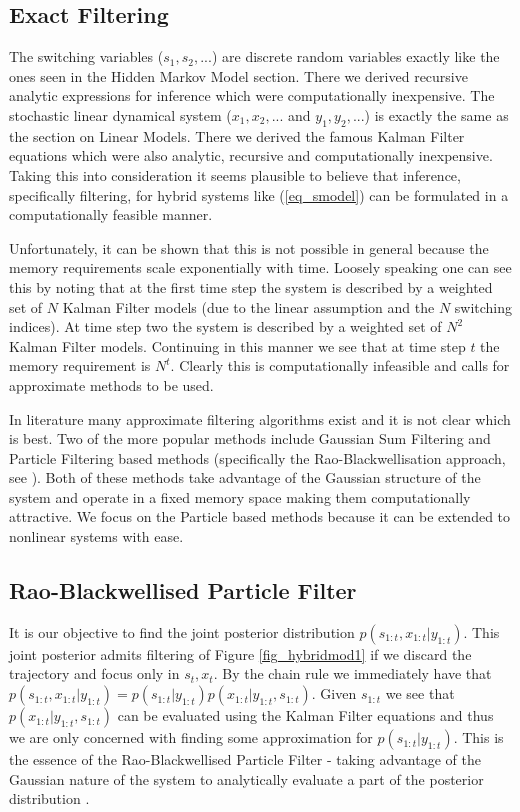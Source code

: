 \subsection{Exact Filtering}
The switching variables ($s_1, s_2,...$) are discrete random variables exactly like the ones seen in the Hidden Markov Model section. There we derived recursive analytic expressions for inference which were computationally inexpensive. The stochastic linear dynamical system ($x_1,x_2,...$ and $y_1, y_2,...$) is exactly the same as the section on Linear Models. There we derived the famous Kalman Filter equations which were also analytic, recursive and computationally inexpensive. Taking this into consideration it seems plausible to believe that inference, specifically filtering, for hybrid systems like (\ref{eq_smodel}) can be formulated in a computationally feasible manner. 

Unfortunately, it can be shown that this is not possible in general \cite{lerner}\cite{murphy3} because the memory requirements scale exponentially with time. Loosely speaking one can see this by noting that at the first time step the system is described by a weighted set of $N$ Kalman Filter models (due to the linear assumption and the $N$ switching indices). At time step two the system is described by a weighted set of $N^2$ Kalman Filter models. Continuing in this manner we see that at time step $t$ the memory requirement is $N^t$. Clearly this is computationally infeasible and calls for approximate methods to be used. 

In literature many approximate filtering algorithms exist and it is not clear which is best. Two of the more popular methods include Gaussian Sum Filtering \cite{barber2} and Particle Filtering based methods (specifically the Rao-Blackwellisation approach, see \cite{chen}\cite{doucet}). Both of these methods take advantage of the Gaussian structure of the system and operate in a fixed memory space making them computationally attractive. We focus on the Particle based methods because it can be extended to nonlinear systems with ease.   

\subsection{Rao-Blackwellised Particle Filter}
It is our objective to find the joint posterior distribution $p(s_{1:t}, x_{1:t}|y_{1:t})$. This joint posterior admits filtering of Figure \ref{fig_hybridmod1} if we discard the trajectory and focus only in $s_t,x_t$. By the chain rule we immediately have that $p(s_{1:t}, x_{1:t}|y_{1:t}) = p(s_{1:t}|y_{1:t})p(x_{1:t}|y_{1:t}, s_{1:t})$. Given $s_{1:t}$ we see that $p(x_{1:t}|y_{1:t}, s_{1:t})$ can be evaluated using the Kalman Filter equations and thus we are only concerned with finding some approximation for $p(s_{1:t}|y_{1:t})$. This is the essence of the Rao-Blackwellised Particle Filter - taking advantage of the Gaussian nature of the system to analytically evaluate a part of the posterior distribution \cite{doucet}.

